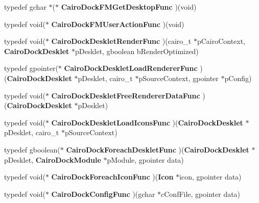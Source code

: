 \begin{CompactItemize}
\item 
typedef gchar $\ast$($\ast$ {\bf CairoDockFMGetDesktopFunc} )(void)
\item 
typedef void($\ast$ {\bf CairoDockFMUserActionFunc} )(void)
\item 
typedef void($\ast$ {\bf CairoDockDeskletRenderFunc} )(cairo\_\-t $\ast$pCairoContext, {\bf CairoDockDesklet} $\ast$pDesklet, gboolean bRenderOptimized)
\item 
typedef gpointer($\ast$ {\bf CairoDockDeskletLoadRendererFunc} )({\bf CairoDockDesklet} $\ast$pDesklet, cairo\_\-t $\ast$pSourceContext, gpointer $\ast$pConfig)
\item 
typedef void($\ast$ {\bf CairoDockDeskletFreeRendererDataFunc} )({\bf CairoDockDesklet} $\ast$pDesklet)
\item 
typedef void($\ast$ {\bf CairoDockDeskletLoadIconsFunc} )({\bf CairoDockDesklet} $\ast$pDesklet, cairo\_\-t $\ast$pSourceContext)
\item 
typedef gboolean($\ast$ {\bf CairoDockForeachDeskletFunc} )({\bf CairoDockDesklet} $\ast$pDesklet, {\bf CairoDockModule} $\ast$pModule, gpointer data)
\item 
typedef void($\ast$ {\bf CairoDockForeachIconFunc} )({\bf Icon} $\ast$icon, gpointer data)
\item 
typedef void($\ast$ {\bf CairoDockConfigFunc} )(gchar $\ast$cConfFile, gpointer data)
\end{CompactItemize}
